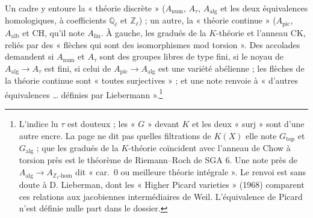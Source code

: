 \documentclass[11pt,a4paper]{article}
\begin{document}

Un cadre y entoure la « théorie discrète » ($A_{\mathrm{num}}$, $A_{\tau}$,
$A_{\mathrm{alg}}$ et les deux équivalences homologiques, à coefficients
$\mathbb{Q}_{\ell}$ et $\mathbb{Z}_{\ell}$) ; un autre, la « théorie
continue » ($A_{\mathrm{pic}}$, $A_{\mathrm{alb}}$ et $\mathrm{CH}$, qu'il
note $A_{\mathrm{lin}}$. À gauche, les gradués de la $K$-théorie et l'anneau
$\mathrm{CK}$, reliés par des « flèches qui sont des isomorphismes mod
torsion ». Des accolades demandent si $A_{\mathrm{num}}$ et $A_{\tau}$ sont des
groupes libres de type fini, si le noyau de $A_{\mathrm{alg}} \to A_{\tau}$ est
fini, si celui de $A_{\mathrm{pic}} \to A_{\mathrm{alg}}$ est une variété
abélienne ; les flèches de la théorie continue sont « toutes surjectives » ; et
une note renvoie à « d'autres équivalences … définies par
Liebermann ».\footnote{L'indice lu $\tau$ est douteux ; les « $G$ » devant $K$
et les deux « surj » sont d'une autre encre. La page ne dit pas quelles
filtrations de $K(X)$ elle note $G_{\mathrm{top}}$ et $G_{\mathrm{alg}}$ ; que
les gradués de la $K$-théorie coïncident avec l'anneau de Chow à torsion près
est le théorème de Riemann--Roch de SGA 6. Une note près de $A_{\mathrm{alg}}
\to A_{\mathbb{Z}_{\ell}\text{-hom}}$ dit « car.\ 0 ou meilleure théorie
intégrale ». Le renvoi est sans doute à D. Lieberman, dont les « Higher Picard
varieties » (1968) comparent ces relations aux jacobiennes intermédiaires de
Weil. L'équivalence de Picard n'est définie nulle part dans le dossier.}
\end{document}
